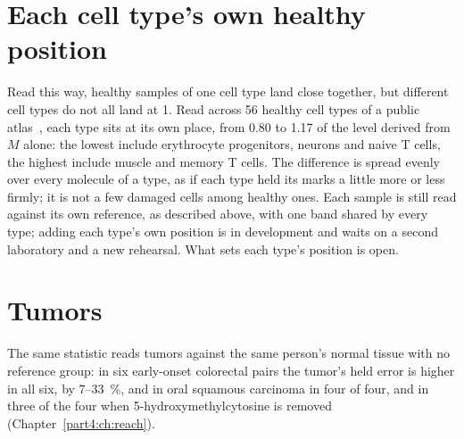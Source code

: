 \section{Each cell type's own healthy position}\label{sec:iama_positions}

Read this way, healthy samples of one cell type land close together, but different cell types do not all land at 1. Read across
56 healthy cell types of a public atlas~\cite{Loyfer2023}, each type sits at its own place, from 0.80 to 1.17 of the level derived
from $M$ alone: the lowest include erythrocyte progenitors, neurons and naive T cells, the highest include muscle and memory T cells. \measured{}
The difference is spread evenly over every molecule of a type, as if each type held its marks a little more or less firmly; it is not a few
damaged cells among healthy ones. \interp{} Each sample is still read against its own reference, as described above, with one band shared by every type; adding each
type's own position is in development and waits on a second laboratory and a new rehearsal. What sets each type's position is open. \openprob

\section{Tumors}

The same statistic reads tumors against the same person's normal tissue with no reference group: in six early-onset
colorectal pairs the tumor's held error is higher in all six, by 7--33~\%, and in oral squamous carcinoma in four of four, and in
three of the four when 5-hydroxymethylcytosine is removed (Chapter~\ref{part4:ch:reach}). \measured
